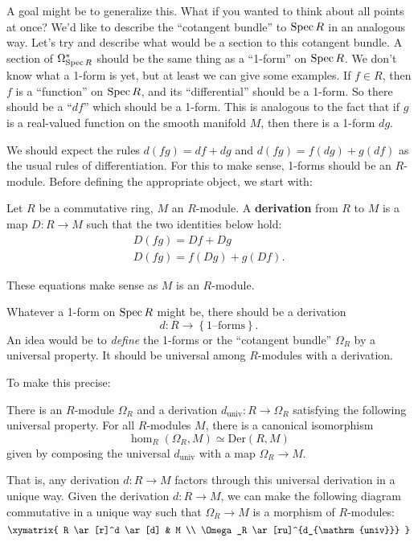 A goal might be to generalize this. What if you wanted to think about all
points at once? We'd like to describe the ``cotangent bundle'' to $\operatorname{Spec} R$ in
an analogous way. Let's try and describe what would be a section to this
cotangent bundle. A section of $\Omega^*_{\operatorname{Spec} R}$ should be the same
thing as a ``1-form'' on $\operatorname{Spec} R$. We don't know what a 1-form is yet, but at
least we can give some examples. If $f \in R$, then $f$ is a ``function'' on
$\operatorname{Spec} R$, and its ``differential'' should be a 1-form. So there should be a
``$df$'' which should be a 1-form. 
This is analogous to the fact that if $g$ is a real-valued function on the
smooth manifold $M$, then there is a 1-form $dg$.

We should expect the rules $d(fg)= df+dg$ and $d(fg) = f(dg) + g(df)$ as the
usual rules of differentiation. For this to make sense, 1-forms should be an
$R$-module. 
Before defining the appropriate object, we start with:

\begin{definition} 
Let $R$ be a commutative ring, $M$ an $R$-module. A \textbf{derivation} from
$R$ to $M$ is a map $D: R \to M$ such that the two identities below hold:
\begin{gather} D(fg)= Df + Dg  \\
 D(fg) = f(Dg) + g(Df).  \end{gather}
\end{definition} 
These equations make sense as $M$ is an $R$-module.

Whatever a 1-form on $\operatorname{Spec} R$ might be, there should be a derivation
\[ d: R \to \left\{\text{1--forms}\right\}.  \]
An idea would be to \emph{define} the 1-forms or the ``cotangent bundle''
$\Omega_R$ by a
universal property. It should be universal among $R$-modules with a derivation.

To make this precise:
\begin{proposition} 
There is an $R$-module $\Omega_R$ and a derivation $d_{\mathrm{univ}} : R \to
\Omega_R$ satisfying the following universal property. For all $R$-modules
$M$, there is a canonical isomorphism 
\[ \hom_{R}(\Omega_R, M) \simeq \mathrm{Der}(R, M)  \]
given by composing the universal $d_{\mathrm{univ}}$ with a map $\Omega_R \to M$.
\end{proposition} 

That is, any derivation $d: R \to M$ factors through this universal derivation
in a unique way. Given the derivation $d: R \to M$, we can make the following diagram
commutative in a unique way such that $\Omega_R \to M$ is a morphism of
$R$-modules:
\[ 
\xymatrix{
R \ar[r]^d \ar[d]  &  M \\
\Omega_R \ar[ru]^{d_{\mathrm{univ}}}
}
\]

